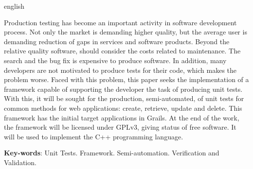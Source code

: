 \begin{resumo}[Abstract]
 \begin{otherlanguage*}{english}

\vspace{\onelineskip}
 Production testing has become an important activity in software development process. Not only the market is demanding higher quality, but the average user is demanding reduction of gaps in services and software products. Beyond the relative quality software, should consider the costs related to maintenance. The search and the bug fix is expensive to produce software. In addition, many developers are not motivated to produce tests for their code, which makes the problem worse. Faced with this problem, this paper seeks the implementation of a framework capable of supporting the developer the task of producing unit tests. With this, it will be sought for the production, semi-automated, of unit tests for common methods for web applications: create, retrieve, update and delete. This framework has the initial target applications in Grails. At the end of the work, the framework will be licensed under GPLv3, giving status of free software. It will be used to implement the C++ programming language.
   \noindent 
   
   \textbf{Key-words}: Unit Tests. Framework. Semi-automation. Verification and Validation.
 \end{otherlanguage*}
\end{resumo}
